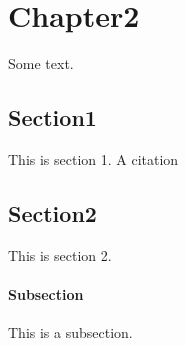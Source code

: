 \chapter{Chapter2}
\label{sec:chapter_2}

Some text.

\section{Section1}
\label{sec:c2_s1}

This is section 1.
A citation \cite{ROS}

\newpage
\section{Section2}
\label{sec:c2_s2}

This is section 2.

\subsubsection{Subsection}
This is a subsection.